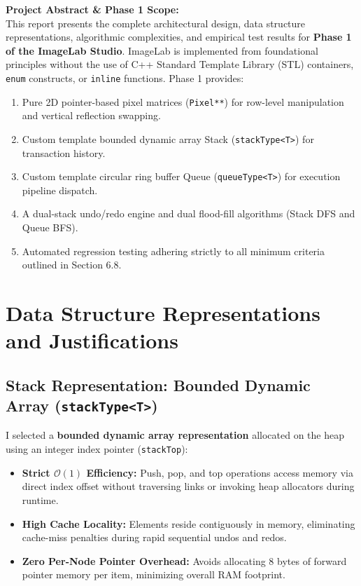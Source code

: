 \documentclass[9.5pt,a4paper]{article}
\begin{document}
\vspace{1.8cm}
\noindent \textbf{Project Abstract \& Phase 1 Scope:}\\
This report presents the complete architectural design, data structure representations, algorithmic complexities, and empirical test results for \textbf{Phase 1 of the ImageLab Studio}. ImageLab is implemented from foundational principles without the use of C++ Standard Template Library (STL) containers, \texttt{enum} constructs, or \texttt{inline} functions. Phase 1 provides:
\begin{enumerate}
    \item Pure 2D pointer-based pixel matrices (\texttt{Pixel**}) for row-level manipulation and vertical reflection swapping.
    \item Custom template bounded dynamic array Stack (\texttt{stackType<T>}) for transaction history.
    \item Custom template circular ring buffer Queue (\texttt{queueType<T>}) for execution pipeline dispatch.
    \item A dual-stack undo/redo engine and dual flood-fill algorithms (Stack DFS and Queue BFS).
    \item Automated regression testing adhering strictly to all minimum criteria outlined in Section 6.8.
\end{enumerate}

\clearpage


\section{Data Structure Representations and Justifications}

\subsection{Stack Representation: Bounded Dynamic Array (\texttt{stackType<T>})}
I selected a \textbf{bounded dynamic array representation} allocated on the heap using an integer index pointer (\texttt{stackTop}):
\begin{itemize}
    \item \textbf{Strict $\mathcal{O}(1)$ Efficiency:} Push, pop, and top operations access memory via direct index offset without traversing links or invoking heap allocators during runtime.
    \item \textbf{High Cache Locality:} Elements reside contiguously in memory, eliminating cache-miss penalties during rapid sequential undos and redos.
    \item \textbf{Zero Per-Node Pointer Overhead:} Avoids allocating 8 bytes of forward pointer memory per item, minimizing overall RAM footprint.
\end{itemize}
\end{document}

